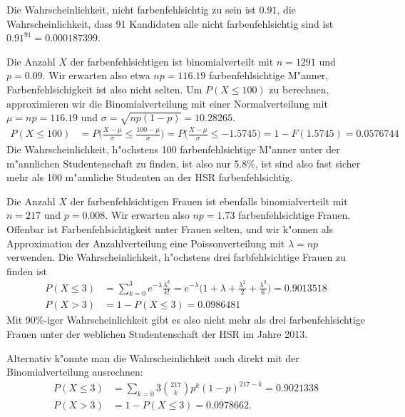 \begin{loesung}
\begin{teilaufgaben}
\item
Die Wahrscheinlichkeit, nicht farbenfehlsichtig zu sein ist $0.91$, die
Wahrscheinlichkeit, dass 91 Kandidaten alle nicht farbenfehlsichtig sind
ist $0.91^{91}=0.000187399$.
\item
Die Anzahl $X$ der farbenfehlsichtigen ist binomialverteilt mit $n=1291$ und
$p=0.09$. Wir erwarten also etwa $np=116.19$ farbenfehlsichtige M"anner,
Farbenfehlsichigkeit ist also nicht selten. Um $P(X\le 100)$ zu
berechnen, approximieren wir die Binomialverteilung mit einer Normalverteilung
mit $\mu=np=116.19$ und $\sigma=\sqrt{np(1-p)}=10.28265$.
\begin{align*}
P(X\le 100)
&=
P\biggl(
\frac{X-\mu}{\sigma}\le \frac{100-\mu}{\sigma}
\biggr)
=
P\biggl(
\frac{X-\mu}{\sigma}\le -1.5745
\biggr)
=
1-F(1.5745)
=
0.0576744
\end{align*}
Die Wahrscheinlichkeit, h"ochstens 100 farbenfehlsichtige M"anner unter
der m"annlichen Studentenschaft zu finden, ist also nur 5.8\%, ist sind
also fast sicher mehr als 100 m"annliche Studenten an der HSR
farbenfehlsichtig.
\item
Die Anzahl $X$ der farbenfehlsichtigen Frauen ist ebenfalls binomialverteilt
mit $n=217$ und $p=0.008$. Wir erwarten also $np=1.73$ farbenfehlsichtige
Frauen. Offenbar ist Farbenfehlsichtigkeit unter Frauen selten, und wir
k"onnen als Approximation der Anzahlverteilung eine Poissonverteilung mit
$\lambda = np$ verwenden.
Die Wahrscheinlichkeit, h"ochstens drei farbfehlsichtige Frauen zu finden
ist
\begin{align*}
P(X\le 3)&=\sum_{k=0}^3 e^{-\lambda}\frac{\lambda^k}{k!}=
e^{-\lambda}\biggl(
1+\lambda +\frac{\lambda^2}{2}+\frac{\lambda^3}{6}
\biggr)
=
0.9013518
\\
P(X>3)&=1-P(X\le 3)=
0.0986481
\end{align*}
Mit 90\%-iger Wahrscheinlichkeit gibt es also nicht mehr als drei
farbenfehlsichtige Frauen unter der weblichen Studentenschaft
der HSR im Jahre 2013.

Alternativ k"onnte man die Wahrscheinlichkeit auch direkt mit der 
Binomialverteilung ausrechnen:
\begin{align*}
P(X\le 3)
&=
\sum_{k=0}3\binom{217}{k}p^k(1-p)^{217-k}=0.9021338
\\
P(X>3)&=1-P(X\le 3)=0.0978662.
\end{align*}
\end{teilaufgaben}
\end{loesung}

